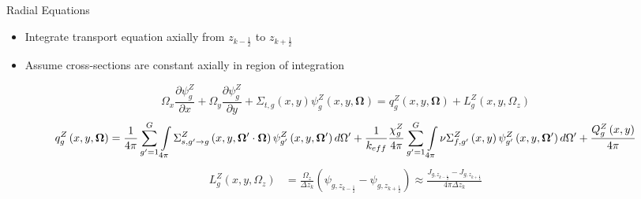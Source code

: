 
\begin{frame}[t]{Radial Equations}
    
    \begin{itemize}
      \item Integrate transport equation axially from $z_{k-\frac{1}{2}}$ to 
      $z_{k+\frac{1}{2}}$
      \item Assume cross-sections are constant axially in region of integration
    \end{itemize}
    \begin{dmath*}
        {\Omega_x\frac{\partial \psi_{g}^Z}{\partial x} + 
        \Omega_y\frac{\partial \psi_{g}^Z}{\partial y}} + 
        {\Sigma_{t,g}\left(x,y\right)\psi_{g}^Z\left(x,y,\bm\Omega\right)} = 
        {q_{g}^Z\left(x,y,\bm \Omega\right)} + 
        {L_{g}^Z\left(x,y,\Omega_z\right)}
    \end{dmath*}
    \begin{dmath*}
        {q_{g}^Z\left(x,y,\bm \Omega\right)} = 
        {\frac{1}{4\pi}\sum_{g'=1}^{G}\intop_{4\pi}\Sigma_{s,g'\rightarrow 
        g}^Z\left(x,y,\bm\Omega'\cdot\bm\Omega\right)\psi_{g'}^Z\left(x,y,\bm\Omega'\right)d\Omega'}
         + {\frac{1}{k_{eff}}\frac{\chi_{g}^Z}{4\pi}\sum_{g'=1}^G\intop_{4\pi} 
        \nu\Sigma_{f,g'}^Z\left(x,y\right)\psi_{g'}^Z\left(x,y,\bm\Omega'\right)d\Omega'}
         + {\frac{Q_{g}^Z\left(x,y\right)}{4\pi}}
    \end{dmath*}
    \begin{align*}
    L_{g}^Z\left(x,y,\Omega_z\right) &= \frac{\Omega_z}{\Delta z_k}\left(\psi_{g,z_{k-\frac{1}{2}}} - \psi_{g,z_{k+\frac{1}{2}}}\right) \approx \frac{J_{g,z_{k-\frac{1}{2}}} - J_{g,z_{k+\frac{1}{2}}}}{4\pi\Delta z_k}
    \end{align*}
    
\end{frame}


